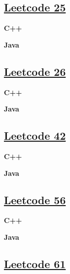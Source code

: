 \subsection{\href{https://leetcode-cn.com/}{Leetcode 25}}\label{app:codelist:leetcode:25}

\textbf{C++}\par


\textbf{Java}\par



\subsection{\href{https://leetcode-cn.com/}{Leetcode 26}}\label{app:codelist:leetcode:26}

\textbf{C++}\par


\textbf{Java}\par



\subsection{\href{https://leetcode-cn.com/}{Leetcode 42}}\label{app:codelist:leetcode:42}

\textbf{C++}\par


\textbf{Java}\par



\subsection{\href{https://leetcode-cn.com/}{Leetcode 56}}\label{app:codelist:leetcode:56}

\textbf{C++}\par


\textbf{Java}\par



\subsection{\href{https://leetcode-cn.com/}{Leetcode 61}}\label{app:codelist:leetcode:61}

